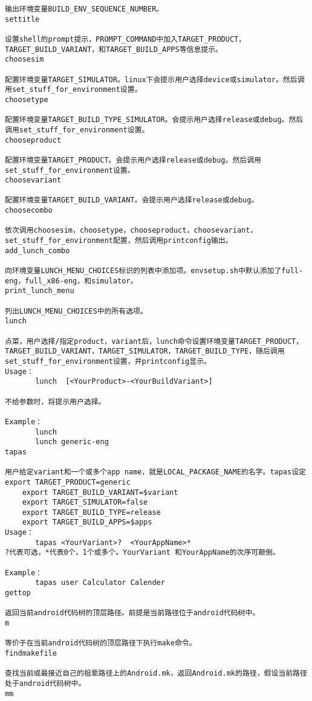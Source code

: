\documentclass[12pt,a4paper]{article}
\begin{document}
\begin{verbatim}
输出环境变量BUILD_ENV_SEQUENCE_NUMBER。
settitle
 
设置shell的prompt提示，PROMPT_COMMAND中加入TARGET_PRODUCT，TARGET_BUILD_VARIANT，和TARGET_BUILD_APPS等信息提示。
choosesim
 
配置环境变量TARGET_SIMULATOR。linux下会提示用户选择device或simulator。然后调用set_stuff_for_environment设置。
choosetype
 
配置环境变量TARGET_BUILD_TYPE_SIMULATOR。会提示用户选择release或debug。然后调用set_stuff_for_environment设置。
chooseproduct
 
配置环境变量TARGET_PRODUCT。会提示用户选择release或debug。然后调用set_stuff_for_environment设置。
choosevariant
 
配置环境变量TARGET_BUILD_VARIANT。会提示用户选择release或debug。
choosecombo
 
依次调用choosesim，choosetype，chooseproduct，choosevariant，set_stuff_for_environment配置，然后调用printconfig输出。
add_lunch_combo
 
向环境变量LUNCH_MENU_CHOICES标识的列表中添加项。envsetup.sh中默认添加了full-eng，full_x86-eng，和simulator。
print_lunch_menu
 
列出LUNCH_MENU_CHOICES中的所有选项。
lunch
 
点菜，用户选择/指定product，variant后，lunch命令设置环境变量TARGET_PRODUCT，TARGET_BUILD_VARIANT，TARGET_SIMULATOR，TARGET_BUILD_TYPE，随后调用set_stuff_for_environment设置，并printconfig显示。
Usage：
       lunch  [<YourProduct>-<YourBuildVariant>]
 
不给参数时，将提示用户选择。
 
Example：
       lunch
       lunch generic-eng
tapas
 
用户给定variant和一个或多个app name，就是LOCAL_PACKAGE_NAME的名字。tapas设定
export TARGET_PRODUCT=generic
    export TARGET_BUILD_VARIANT=$variant
    export TARGET_SIMULATOR=false
    export TARGET_BUILD_TYPE=release
    export TARGET_BUILD_APPS=$apps
Usage：
       tapas <YourVariant>?  <YourAppName>*
?代表可选，*代表0个，1个或多个。YourVariant 和YourAppName的次序可颠倒。
 
Example：
       tapas user Calculator Calender
gettop
 
返回当前android代码树的顶层路径。前提是当前路径位于android代码树中。
m
 
等价于在当前android代码树的顶层路径下执行make命令。
findmakefile
 
查找当前或最接近自己的祖辈路径上的Android.mk，返回Android.mk的路径，假设当前路径处于android代码树中。
mm
 

\end{verbatim}
\end{document}
